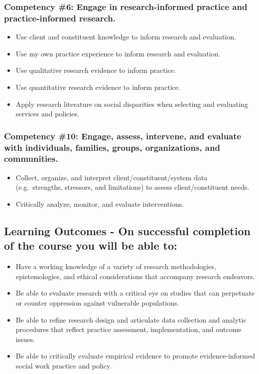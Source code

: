\documentclass[11pt,]{article}
\providecommand{\tightlist}{%
  \setlength{\itemsep}{0pt}\setlength{\parskip}{0pt}}
\begin{document}
\subsubsection{Competency \#6: Engage in research-informed practice and
practice-informed
research.}\label{competency-6-engage-in-research-informed-practice-and-practice-informed-research.}

\begin{itemize}
\tightlist
\item
  Use client and constituent knowledge to inform research and
  evaluation.
\item
  Use my own practice experience to inform research and evaluation.
\item
  Use qualitative research evidence to inform practice.
\item
  Use quantitative research evidence to inform practice.
\item
  Apply research literature on social disparities when selecting and
  evaluating services and policies.
\end{itemize}

\subsubsection{Competency \#10: Engage, assess, intervene, and evaluate
with individuals, families, groups, organizations, and
communities.}\label{competency-10-engage-assess-intervene-and-evaluate-with-individuals-families-groups-organizations-and-communities.}

\begin{itemize}
\tightlist
\item
  Collect, organize, and interpret client/constituent/system data
  (e.g.~strengths, stressors, and limitations) to assess
  client/constituent needs.
\item
  Critically analyze, monitor, and evaluate interventions.
\end{itemize}

\subsection{Learning Outcomes - On successful completion of the course
you will be able
to:}\label{learning-outcomes---on-successful-completion-of-the-course-you-will-be-able-to}

\begin{itemize}
\tightlist
\item
  Have a working knowledge of a variety of research methodologies,
  epistemologies, and ethical considerations that accompany research
  endeavors.
\item
  Be able to evaluate research with a critical eye on studies that can
  perpetuate or counter oppression against vulnerable populations.
\item
  Be able to refine research design and articulate data collection and
  analytic procedures that reflect practice assessment, implementation,
  and outcome issues.
\item
  Be able to critically evaluate empirical evidence to promote
  evidence-informed social work practice and policy.
\end{itemize}
\end{document}
